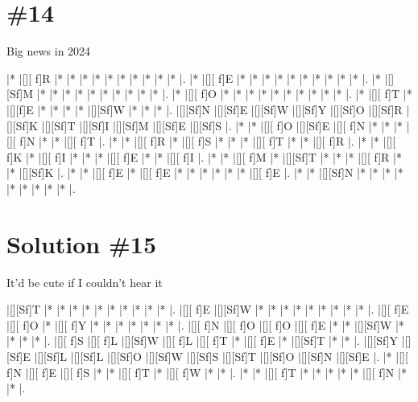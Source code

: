 \documentclass[letterpaper]{article}
\begin{document}
\section*{\#14}
Big news in 2024

\vspace*{1em}
\begin{Puzzle}{12}{12}
|*        |[][ f]R  |*        |*        |*        |*        |*        |*        |*        |*        |*        |*        |.
|*        |[][ f]E  |*        |*        |*        |*        |*        |*        |*        |*        |*        |*        |.
|*        |[][Sf]M  |*        |*        |*        |*        |*        |*        |*        |*        |*        |*        |.
|*        |[][ f]O  |*        |*        |*        |*        |*        |*        |*        |*        |*        |*        |.
|*        |[][ f]T  |*        |[][f]E   |*        |*        |*        |*        |[][Sf]W  |*        |*        |*        |.
|[][Sf]N  |[][Sf]E  |[][Sf]W  |[][Sf]Y  |[][Sf]O  |[][Sf]R  |[][Sf]K  |[][Sf]T  |[][Sf]I  |[][Sf]M  |[][Sf]E  |[][Sf]S  |.
|*        |*        |[][ f]O  |[][Sf]E  |[][ f]N  |*        |*        |*        |[][ f]N  |*        |*        |[][ f]T  |.
|*        |*        |[][ f]R  |*        |[][ f]S  |*        |*        |*        |[][ f]T  |*        |*        |[][ f]R  |.
|*        |*        |[][ f]K  |*        |[][ f]I  |*        |*        |*        |[][ f]E  |*        |*        |[][ f]I  |.
|*        |*        |[][ f]M  |*        |[][Sf]T  |*        |*        |*        |[][ f]R  |*        |*        |[][Sf]K  |.
|*        |*        |[][ f]E  |*        |[][ f]E  |*        |*        |*        |*        |*        |*        |[][ f]E  |.
|*        |*        |[][Sf]N  |*        |*        |*        |*        |*        |*        |*        |*        |*        |.
\end{Puzzle}

\section*{Solution \#15}
It'd be cute if I couldn't hear it

\vspace*{1em}
\begin{Puzzle}{11}{9}
|[][Sf]T  |*        |*        |*        |*        |*        |*        |*        |*        |*        |*        |.
|[][ f]E  |[][Sf]W  |*        |*        |*        |*        |*        |*        |*        |*        |*        |.
|[][ f]E  |[][ f]O  |*        |[][ f]Y  |*        |*        |*        |*        |*        |*        |*        |.
|[][ f]N  |[][ f]O  |[][ f]O  |[][ f]E  |*        |*        |[][Sf]W  |*        |*        |*        |*        |.
|[][ f]S  |[][ f]L  |[][Sf]W  |[][ f]L  |[][ f]T  |*        |[][ f]E  |*        |[][Sf]T  |*        |*        |.
|[][Sf]Y  |[][Sf]E  |[][Sf]L  |[][Sf]L  |[][Sf]O  |[][Sf]W  |[][Sf]S  |[][Sf]T  |[][Sf]O  |[][Sf]N  |[][Sf]E  |.
|*        |[][ f]N  |[][ f]E  |[][ f]S  |*        |*        |[][ f]T  |*        |[][ f]W  |*        |*        |.
|*        |*        |[][ f]T  |*        |*        |*        |*        |*        |[][ f]N  |*        |*        |.
\end{Puzzle}
\end{document}
